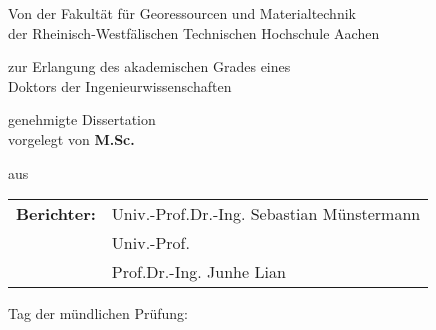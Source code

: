 \begin{titlepage}
    \begin{center}
        \large
        \vspace*{1cm}
        
        \textbf{\titlename}
        
        
        \vspace*{1.0cm}
        Von der Fakultät für Georessourcen und Materialtechnik\\
        der Rheinisch-Westfälischen Technischen Hochschule Aachen
        
        \vspace*{1.5cm}
        zur Erlangung des akademischen Grades eines\\
        Doktors der Ingenieurwissenschaften
        
        \vspace*{1.5cm}
        genehmigte Dissertation \\
        vorgelegt von \textbf{M.Sc.}
        
        \vspace*{2.0cm}
        \textbf{\authorname}
        
        \vspace*{2.0cm}
        aus \fromcityname
    \end{center}
    
    \large
    \vspace*{2.0cm}
    
    \begin{tabular}{l  l}
        \textbf{Berichter:} & Univ.-Prof.Dr.-Ing. Sebastian Münstermann \\
                            & Univ.-Prof. \\
                            & Prof.Dr.-Ing. Junhe Lian
    \end{tabular}
    
    \vspace*{2.0cm}
    Tag der mündlichen Prüfung: 
    
    \normalsize
    \vspace*{1.5cm}


\end{titlepage}









